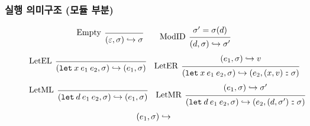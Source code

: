 \documentclass{beamer}
\theoremstyle{definition}
\newcommand*{\cons}{:{\hspace{-0.7em}}:}
\newcommand*{\modid}{d}
\newcommand*{\ctx}{\sigma}
\newcommand*{\semarrow}{\hookrightarrow}
\begin{document}
\begin{frame}[c]
  \frametitle{실행 의미구조 (모듈 부분)}
  \begin{figure}[h!]
    \centering
    \scriptsize
    \begin{flushright}
      \fbox{$(e,\ctx)\semarrow V\text{ or }(e',\ctx')$}
    \end{flushright}
    \[
      \begin{prooftree}
        \infer[left label=Empty]0{
        (\varepsilon, \ctx)
        \semarrow
        \ctx
        }
      \end{prooftree}\qquad
      \begin{prooftree}
        \hypo{\ctx'=\ctx(\modid)}
        \infer[left label=ModID]1{
        (\modid, \ctx)
        \semarrow
        \ctx'
        }
      \end{prooftree}
    \]
    \[
      \begin{prooftree}
        \infer[left label=LetEL]0{
        (\mathtt{let}\:x\:e_1\:e_2, \ctx)
        \semarrow
        (e_{1}, \ctx)
        }
      \end{prooftree}\quad
      \begin{prooftree}
        \hypo{
          \begin{matrix}
            (e_{1}, \ctx)
            \semarrow
            v
          \end{matrix}
        }
        \infer[left label=LetER]1{
        (\mathtt{let}\:x\:e_1\:e_2, \ctx)
        \semarrow
        (e_{2}, (x, v)\cons \ctx)
        }
      \end{prooftree}
    \]
    \[
      \begin{prooftree}
        \infer[left label=LetML]0{
        (\mathtt{let}\:\modid\:e_{1}\:e_{2}, \ctx)
        \semarrow
        (e_{1}, \ctx)
        }
      \end{prooftree}\quad
      \begin{prooftree}
        \hypo{
          \begin{matrix}
            (e_{1}, \ctx)
            \semarrow
            \ctx'
          \end{matrix}
        }
        \infer[left label=LetMR]1{
        (\mathtt{let}\:\modid\:e_{1}\:e_{2}, \ctx)
        \semarrow
        (e_{2}, (\modid, \ctx')\cons \ctx)
        }
      \end{prooftree}
    \]
    \[
      \begin{prooftree}
        \hypo{
          \begin{matrix}
            (e_{1}, \ctx)
            \semarrow

\end{matrix}}
\end{prooftree}\]
\end{figure}
\end{frame}
\end{document}
